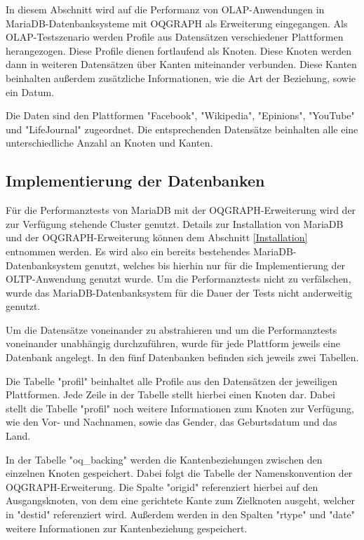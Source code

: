 In diesem Abschnitt wird auf die Performanz von OLAP-Anwendungen in MariaDB-Datenbanksysteme mit OQGRAPH als Erweiterung eingegangen. Als OLAP-Testszenario werden Profile aus Datensätzen verschiedener Plattformen herangezogen. Diese Profile dienen fortlaufend als Knoten. Diese Knoten werden dann in weiteren Datensätzen über Kanten miteinander verbunden. Diese Kanten beinhalten außerdem zusätzliche Informationen, wie die Art der Beziehung, sowie ein Datum.

Die Daten sind den Plattformen "Facebook", "Wikipedia", "Epinions", "YouTube" und "LifeJournal" zugeordnet. Die entsprechenden Datensätze beinhalten alle eine unterschiedliche Anzahl an Knoten und Kanten.

\subsection{Implementierung der Datenbanken}

Für die Performanztests von MariaDB mit der OQGRAPH-Erweiterung wird der zur Verfügung stehende Cluster genutzt. Details zur Installation von MariaDB und der OQGRAPH-Erweiterung können dem Abschnitt \ref{Installation} entnommen werden. Es wird also ein bereits bestehendes MariaDB-Datenbanksystem genutzt, welches bis hierhin nur für die Implementierung der OLTP-Anwendung genutzt wurde. Um die Performanztests nicht zu verfälschen, wurde das MariaDB-Datenbanksystem für die Dauer der Tests nicht anderweitig genutzt.

Um die Datensätze voneinander zu abstrahieren und um die Performanztests voneinander unabhängig durchzuführen, wurde für jede Plattform jeweils eine Datenbank angelegt. In den fünf Datenbanken befinden sich jeweils zwei Tabellen.

Die Tabelle "profil" beinhaltet alle Profile aus den Datensätzen der jeweiligen Plattformen. Jede Zeile in der Tabelle stellt hierbei einen Knoten dar. Dabei stellt die Tabelle "profil" noch weitere Informationen zum Knoten zur Verfügung, wie den Vor- und Nachnamen, sowie das Gender, das Geburtsdatum und das Land.

In der Tabelle "oq\_backing" werden die Kantenbeziehungen zwischen den einzelnen Knoten gespeichert. Dabei folgt die Tabelle der Namenskonvention der OQGRAPH-Erweiterung. Die Spalte "origid" referenziert hierbei auf den Ausgangsknoten, von dem eine gerichtete Kante zum Zielknoten ausgeht, welcher in "destid" referenziert wird. Außerdem werden in den Spalten "rtype" und "date" weitere Informationen zur Kantenbeziehung gespeichert.

